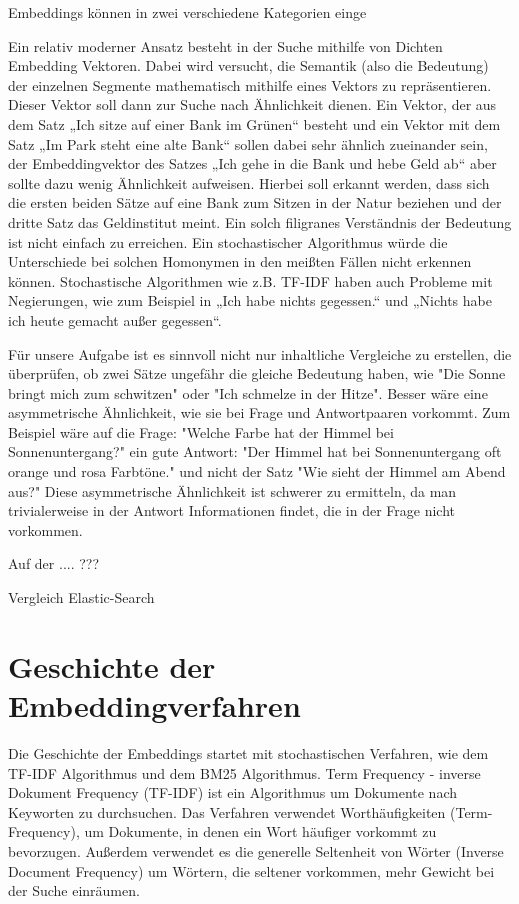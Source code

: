 Embeddings können in zwei verschiedene Kategorien einge

Ein relativ moderner Ansatz besteht in der Suche mithilfe von Dichten Embedding Vektoren. 
Dabei wird versucht, die Semantik (also die Bedeutung) der einzelnen Segmente mathematisch mithilfe eines Vektors zu repräsentieren. 
Dieser Vektor soll dann zur Suche nach Ähnlichkeit dienen. 
Ein Vektor, der aus dem Satz „Ich sitze auf einer Bank im Grünen“ besteht und ein Vektor mit dem Satz „Im Park steht eine alte Bank“ sollen dabei sehr ähnlich zueinander sein, der Embeddingvektor des Satzes „Ich gehe in die Bank und hebe Geld ab“ aber sollte dazu wenig Ähnlichkeit aufweisen. 
Hierbei soll erkannt werden, dass sich die ersten beiden Sätze auf eine Bank zum Sitzen in der Natur beziehen und der dritte Satz das Geldinstitut meint. 
Ein solch filigranes Verständnis der Bedeutung ist nicht einfach zu erreichen. 
Ein stochastischer Algorithmus würde die Unterschiede bei solchen Homonymen in den meißten Fällen nicht erkennen können. 
Stochastische Algorithmen wie z.B. TF-IDF haben auch Probleme mit Negierungen, wie zum Beispiel in „Ich habe nichts gegessen.“ und „Nichts habe ich heute gemacht außer gegessen“.

Für unsere Aufgabe ist es sinnvoll nicht nur inhaltliche Vergleiche zu erstellen, die überprüfen, ob zwei Sätze ungefähr die gleiche Bedeutung haben, wie "Die Sonne bringt mich zum schwitzen" oder "Ich schmelze in der Hitze".
Besser wäre eine asymmetrische Ähnlichkeit, wie sie bei Frage und Antwortpaaren vorkommt.
Zum Beispiel wäre auf die Frage: "Welche Farbe hat der Himmel bei Sonnenuntergang?" ein gute Antwort: "Der Himmel hat bei Sonnenuntergang oft orange und rosa Farbtöne."  und nicht der Satz "Wie sieht der Himmel am Abend aus?"
Diese asymmetrische Ähnlichkeit ist schwerer zu ermitteln, da man trivialerweise in der Antwort Informationen findet, die in der Frage nicht vorkommen.

Auf der .... ??? 

Vergleich Elastic-Search


\section{Geschichte der Embeddingverfahren}

Die Geschichte der Embeddings startet mit stochastischen Verfahren, wie dem TF-IDF Algorithmus und dem BM25 Algorithmus. 
Term Frequency - inverse Dokument Frequency (TF-IDF) ist ein Algorithmus um Dokumente nach Keyworten zu durchsuchen.
Das Verfahren verwendet Worthäufigkeiten (Term-Frequency), um Dokumente, in denen ein Wort häufiger vorkommt zu bevorzugen.
Außerdem verwendet es die generelle Seltenheit von Wörter (Inverse Document Frequency) um Wörtern, die seltener vorkommen, mehr Gewicht bei der Suche einräumen.

